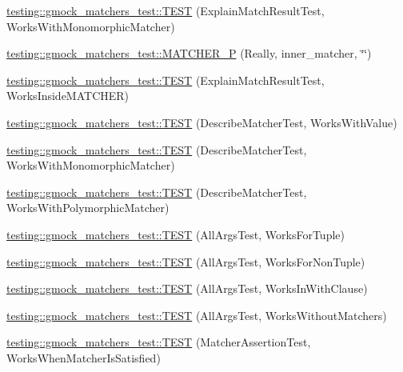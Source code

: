 \begin{DoxyCompactItemize}
\item 
\mbox{\hyperlink{namespacetesting_1_1gmock__matchers__test_aeff2711a03b27a66c1c98ed97ff49b09}{testing\+::gmock\+\_\+matchers\+\_\+test\+::\+T\+E\+ST}} (Explain\+Match\+Result\+Test, Works\+With\+Monomorphic\+Matcher)
\item 
\mbox{\hyperlink{namespacetesting_1_1gmock__matchers__test_ab4f04d3b75ca92e4f5fd711b9f2a514a}{testing\+::gmock\+\_\+matchers\+\_\+test\+::\+M\+A\+T\+C\+H\+E\+R\+\_\+P}} (Really, inner\+\_\+matcher, \char`\"{}\char`\"{})
\item 
\mbox{\hyperlink{namespacetesting_1_1gmock__matchers__test_ae57edef8890da6b929dd0d21c2f7c071}{testing\+::gmock\+\_\+matchers\+\_\+test\+::\+T\+E\+ST}} (Explain\+Match\+Result\+Test, Works\+Inside\+M\+A\+T\+C\+H\+ER)
\item 
\mbox{\hyperlink{namespacetesting_1_1gmock__matchers__test_a2777633a1fadcdb5b6ad1a8ee78a8b54}{testing\+::gmock\+\_\+matchers\+\_\+test\+::\+T\+E\+ST}} (Describe\+Matcher\+Test, Works\+With\+Value)
\item 
\mbox{\hyperlink{namespacetesting_1_1gmock__matchers__test_a3874504a484739f047b6e3c295b5764a}{testing\+::gmock\+\_\+matchers\+\_\+test\+::\+T\+E\+ST}} (Describe\+Matcher\+Test, Works\+With\+Monomorphic\+Matcher)
\item 
\mbox{\hyperlink{namespacetesting_1_1gmock__matchers__test_a6232037654e87ad5ddd4a21abd73a5a4}{testing\+::gmock\+\_\+matchers\+\_\+test\+::\+T\+E\+ST}} (Describe\+Matcher\+Test, Works\+With\+Polymorphic\+Matcher)
\item 
\mbox{\hyperlink{namespacetesting_1_1gmock__matchers__test_aeea300647af4c7611f4e491cabcbf950}{testing\+::gmock\+\_\+matchers\+\_\+test\+::\+T\+E\+ST}} (All\+Args\+Test, Works\+For\+Tuple)
\item 
\mbox{\hyperlink{namespacetesting_1_1gmock__matchers__test_aacc3ed6d6a0f9ff552019d0d58817b6f}{testing\+::gmock\+\_\+matchers\+\_\+test\+::\+T\+E\+ST}} (All\+Args\+Test, Works\+For\+Non\+Tuple)
\item 
\mbox{\hyperlink{namespacetesting_1_1gmock__matchers__test_ad62534535946b2ef45457fb653f73a98}{testing\+::gmock\+\_\+matchers\+\_\+test\+::\+T\+E\+ST}} (All\+Args\+Test, Works\+In\+With\+Clause)
\item 
\mbox{\hyperlink{namespacetesting_1_1gmock__matchers__test_ab923c90d7512191ce1cb37055e76e9b9}{testing\+::gmock\+\_\+matchers\+\_\+test\+::\+T\+E\+ST}} (All\+Args\+Test, Works\+Without\+Matchers)
\item 
\mbox{\hyperlink{namespacetesting_1_1gmock__matchers__test_ad37559f9112c04334a62ce9617cf1349}{testing\+::gmock\+\_\+matchers\+\_\+test\+::\+T\+E\+ST}} (Matcher\+Assertion\+Test, Works\+When\+Matcher\+Is\+Satisfied)

\end{DoxyCompactItemize}
